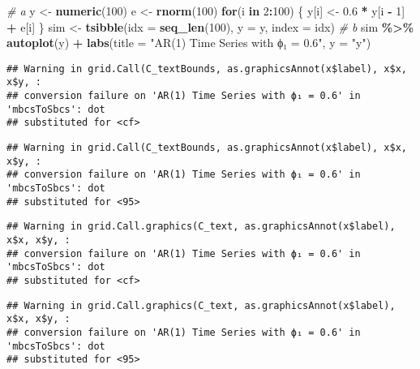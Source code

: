 \documentclass[
]{article}
\newenvironment{Shaded}{\begin{snugshade}}{\end{snugshade}}
\newcommand{\AttributeTok}[1]{\textcolor[rgb]{0.13,0.29,0.53}{#1}}
\newcommand{\CommentTok}[1]{\textcolor[rgb]{0.56,0.35,0.01}{\textit{#1}}}
\newcommand{\ControlFlowTok}[1]{\textcolor[rgb]{0.13,0.29,0.53}{\textbf{#1}}}
\newcommand{\DecValTok}[1]{\textcolor[rgb]{0.00,0.00,0.81}{#1}}
\newcommand{\FloatTok}[1]{\textcolor[rgb]{0.00,0.00,0.81}{#1}}
\newcommand{\FunctionTok}[1]{\textcolor[rgb]{0.13,0.29,0.53}{\textbf{#1}}}
\newcommand{\NormalTok}[1]{#1}
\newcommand{\OtherTok}[1]{\textcolor[rgb]{0.56,0.35,0.01}{#1}}
\newcommand{\SpecialCharTok}[1]{\textcolor[rgb]{0.81,0.36,0.00}{\textbf{#1}}}
\newcommand{\StringTok}[1]{\textcolor[rgb]{0.31,0.60,0.02}{#1}}
\begin{document}
\begin{Shaded}
\begin{Highlighting}[]
\CommentTok{\# a }
\NormalTok{y }\OtherTok{\textless{}{-}} \FunctionTok{numeric}\NormalTok{(}\DecValTok{100}\NormalTok{)}
\NormalTok{e }\OtherTok{\textless{}{-}} \FunctionTok{rnorm}\NormalTok{(}\DecValTok{100}\NormalTok{)}
\ControlFlowTok{for}\NormalTok{(i }\ControlFlowTok{in} \DecValTok{2}\SpecialCharTok{:}\DecValTok{100}\NormalTok{) \{}
\NormalTok{  y[i] }\OtherTok{\textless{}{-}} \FloatTok{0.6} \SpecialCharTok{*}\NormalTok{ y[i }\SpecialCharTok{{-}} \DecValTok{1}\NormalTok{] }\SpecialCharTok{+}\NormalTok{ e[i]}
\NormalTok{\}}
\NormalTok{sim }\OtherTok{\textless{}{-}} \FunctionTok{tsibble}\NormalTok{(}\AttributeTok{idx =} \FunctionTok{seq\_len}\NormalTok{(}\DecValTok{100}\NormalTok{), }\AttributeTok{y =}\NormalTok{ y, }\AttributeTok{index =}\NormalTok{ idx)}
\CommentTok{\# b }
\NormalTok{sim }\SpecialCharTok{\%\textgreater{}\%}
  \FunctionTok{autoplot}\NormalTok{(y) }\SpecialCharTok{+}
  \FunctionTok{labs}\NormalTok{(}\AttributeTok{title =} \StringTok{"AR(1) Time Series with ϕ₁ = 0.6"}\NormalTok{, }\AttributeTok{y =} \StringTok{"y"}\NormalTok{)}
\end{Highlighting}
\end{Shaded}

\begin{verbatim}
## Warning in grid.Call(C_textBounds, as.graphicsAnnot(x$label), x$x, x$y, :
## conversion failure on 'AR(1) Time Series with ϕ₁ = 0.6' in 'mbcsToSbcs': dot
## substituted for <cf>
\end{verbatim}

\begin{verbatim}
## Warning in grid.Call(C_textBounds, as.graphicsAnnot(x$label), x$x, x$y, :
## conversion failure on 'AR(1) Time Series with ϕ₁ = 0.6' in 'mbcsToSbcs': dot
## substituted for <95>
\end{verbatim}

\begin{verbatim}
## Warning in grid.Call.graphics(C_text, as.graphicsAnnot(x$label), x$x, x$y, :
## conversion failure on 'AR(1) Time Series with ϕ₁ = 0.6' in 'mbcsToSbcs': dot
## substituted for <cf>
\end{verbatim}

\begin{verbatim}
## Warning in grid.Call.graphics(C_text, as.graphicsAnnot(x$label), x$x, x$y, :
## conversion failure on 'AR(1) Time Series with ϕ₁ = 0.6' in 'mbcsToSbcs': dot
## substituted for <95>
\end{verbatim}
\end{document}

